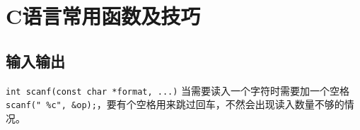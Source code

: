 \chapter{C语言常用函数及技巧}

\section{输入输出}

\lstinline{int scanf(const char *format, ...)}
当需要读入一个字符时需要加一个空格\lstinline{scanf(" %c", &op);}，要有个空格用来跳过回车，不然会出现读入数量不够的情况。